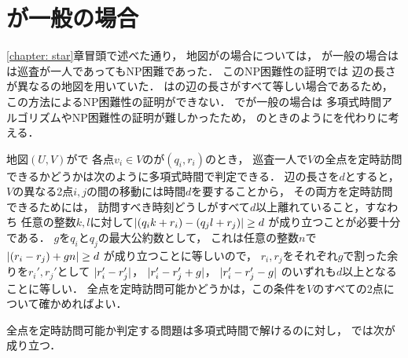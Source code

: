 \section{{\maxIdletime}が一般の場合}
\label{section: UnitArbitraryIdletime}

\ref{chapter: star}章冒頭で述べた通り，
地図が{\graphStar}の場合については，
{\maxIdletime}が一般の場合は
{\PPProfit}は巡査が一人であってもNP困難であった\cite[Theorem~6]{coene2011charlemagne}．
このNP困難性の証明では
辺の長さが異なる{\graphStar}の地図を用いていた．
{\graphUnit}は{\graphStar}の辺の長さがすべて等しい場合であるため，
この方法によるNP困難性の証明ができない．
{\graphUnit}で{\maxIdletime}が一般の場合は
多項式時間アルゴリズムやNP困難性の証明が難しかったため，
{\graphLine}のときのように{\timeSpecifiedPPProfit}を代わりに考える．


地図$(U, V)$が{\graphUnit}で
各点$v_i \in V$の{\exactTime}が$(q_i, r_i)$のとき，
巡査一人で$V$の全点を定時訪問できるかどうかは次のように多項式時間で判定できる．
%
辺の長さを$d$とすると，
$V$の異なる2点$i, j$の間の移動には時間$d$を要することから，
その両方を定時訪問できるためには，
訪問すべき時刻どうしがすべて$d$以上離れていること，すなわち
任意の整数$k, l$に対して$\lvert{(q_i k + r_i) - (q_j l + r_j)}\rvert \geq d$%
が成り立つことが必要十分である．
$g$を$q_i$と$q_j$の最大公約数として，
これは任意の整数$n$で
$\lvert{(r_i - r_j) + gn}\rvert \geq d$%
が成り立つことに等しいので，
$r_i, r_j$をそれぞれ$g$で割った余りを$r_i', r_j'$として
$\lvert{r_i' - r_j'}\rvert$，
$\lvert{r_i' - r_j' + g}\rvert$，
$\lvert{r_i' - r_j' - g}\rvert$%
のいずれも$d$以上となることに等しい．
%
全点を定時訪問可能かどうかは，この条件を$V$のすべての2点について確かめればよい．

全点を定時訪問可能か判定する問題は多項式時間で解けるのに対し，
{\timeSpecifiedPPProfit}では次が成り立つ．


